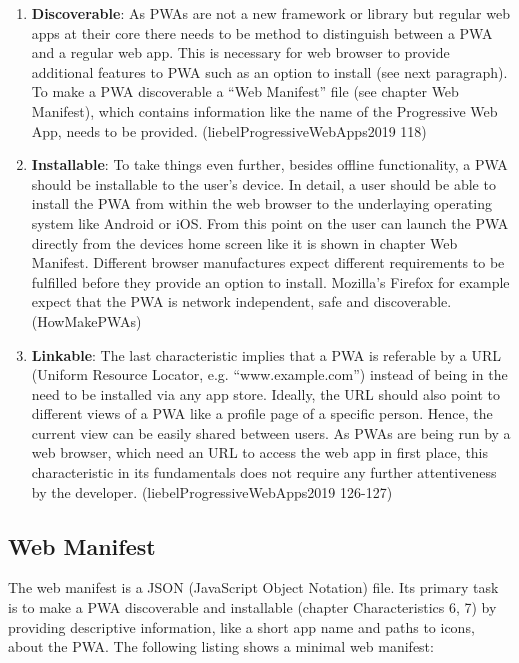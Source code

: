 \begin{enumerate}
	\item \textbf{Discoverable}: As PWAs are not a new framework or library but regular web apps at their core there needs to be method to distinguish between a PWA and a regular web app. This is necessary for web browser to provide additional features to PWA such as an option to install (see next paragraph). To make a PWA discoverable a “Web Manifest” file (see chapter Web Manifest), which contains information like the name of the Progressive Web App, needs to be provided. (liebelProgressiveWebApps2019 118)

	\item \textbf{Installable}: To take things even further, besides offline functionality, a PWA should be installable to the user’s device. In detail, a user should be able to install the PWA from within the web browser to the underlaying operating system like Android or iOS. From this point on the user can launch the PWA directly from the devices home screen like it is shown in chapter Web Manifest. Different browser manufactures expect different requirements to be fulfilled before they provide an option to install. Mozilla’s Firefox for example expect that the PWA is network independent, safe and discoverable. (HowMakePWAs)

	\item \textbf{Linkable}: The last characteristic implies that a PWA is referable by a URL (Uniform Resource Locator, e.g. “www.example.com”) instead of being in the need to be installed via any app store. Ideally, the URL should also point to different views of a PWA like a profile page of a specific person. Hence, the current view can be easily shared between users. As PWAs are being run by a web browser, which need an URL to access the web app in first place, this characteristic in its fundamentals does not require any further attentiveness by the developer. (liebelProgressiveWebApps2019 126-127)
\end{enumerate}

\subsection{Web Manifest}
\label{sec:theorieCb}

The web manifest is a JSON (JavaScript Object Notation) file. Its primary task is to make a PWA discoverable and installable (chapter Characteristics 6, 7) by providing descriptive information, like a short app name and paths to icons, about the PWA. 
The following listing shows a minimal web manifest:

